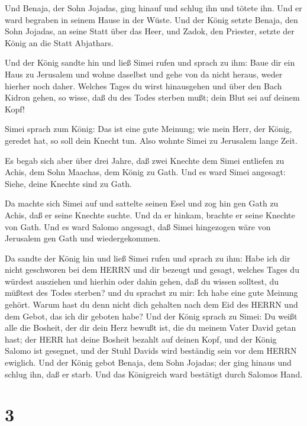 Und Benaja, der Sohn Jojadas, ging hinauf und schlug ihn
und tötete ihn. Und er ward begraben in seinem Hause in der Wüste.
 Und der König setzte Benaja, den Sohn Jojadas, an seine
Statt über das Heer, und Zadok, den Priester, setzte der König an die
Statt Abjathars.

 Und der König sandte hin und ließ Simei rufen und sprach
zu ihm: Baue dir ein Haus zu Jerusalem und wohne daselbst und gehe von
da nicht heraus, weder hierher noch daher.  Welches Tages
du wirst hinausgehen und über den Bach Kidron gehen, so wisse, daß du
des Todes sterben mußt; dein Blut sei auf deinem Kopf!

 Simei sprach zum König: Das ist eine gute Meinung; wie
mein Herr, der König, geredet hat, so soll dein Knecht tun. Also wohnte
Simei zu Jerusalem lange Zeit.

 Es begab sich aber über drei Jahre, daß zwei Knechte dem
Simei entliefen zu Achis, dem Sohn Maachas, dem König zu Gath. Und es
ward Simei angesagt: Siehe, deine Knechte sind zu Gath.

 Da machte sich Simei auf und sattelte seinen Esel und zog
hin gen Gath zu Achis, daß er seine Knechte suchte. Und da er hinkam,
brachte er seine Knechte von Gath.  Und es ward Salomo
angesagt, daß Simei hingezogen wäre von Jerusalem gen Gath und
wiedergekommen.

 Da sandte der König hin und ließ Simei rufen und sprach zu
ihm: Habe ich dir nicht geschworen bei dem HERRN und dir bezeugt und
gesagt, welches Tages du würdest ausziehen und hierhin oder dahin gehen,
daß du wissen solltest, du müßtest des Todes sterben? und du sprachst zu
mir: Ich habe eine gute Meinung gehört.  Warum hast du denn
nicht dich gehalten nach dem Eid des HERRN und dem Gebot, das ich dir
geboten habe?  Und der König sprach zu Simei: Du weißt alle
die Bosheit, der dir dein Herz bewußt ist, die du meinem Vater David
getan hast; der HERR hat deine Bosheit bezahlt auf deinen Kopf,
 und der König Salomo ist gesegnet, und der Stuhl Davids
wird beständig sein vor dem HERRN ewiglich.  Und der König
gebot Benaja, dem Sohn Jojadas; der ging hinaus und schlug ihn, daß er
starb. Und das Königreich ward bestätigt durch Salomos Hand.

\hypertarget{section-2}{%
\section{3}\label{section-2}}

